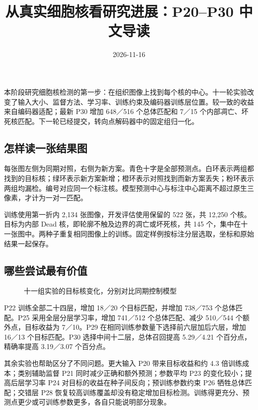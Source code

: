 \documentclass[
  11pt,
  fontset=fandol]{ctexart}
\title{从真实细胞核看研究进展：P20--P30 中文导读}
\author{}
\date{2026-11-16}
\begin{document}
\maketitle

{
\setcounter{tocdepth}{2}
\tableofcontents
}
本阶段研究细胞核检测的第一步：在组织图像上找到每个核的中心。十一轮实验改变了输入大小、监督方法、学习率、训练约束及编码器训练层位置。较一致的收益来自编码器适配；最新
P30 增加 648／516 个总体匹配和 7／15
个内部凋亡、坏死核匹配。下一轮已经提交，转向点解码器中的固定组归一化。

\subsection{怎样读一张结果图}\label{ux600eux6837ux8bfbux4e00ux5f20ux7ed3ux679cux56fe}

每张图左侧为同期对照，右侧为新方案。青色十字是全部预测点。白环表示两组都找到的目标核；绿环表示新方案新增；橙环表示对照找到而新方案丢失；粉环表示两组均漏检。编号对应同一个标注核。模型预测中心与标注中心距离不超过原生三像素，才计为一对一匹配。

训练使用第一折内 2,134 张图像，开发评估使用保留的 522 张，共 12,250
个核。目标为内部 Dead 核，即轮廓不触及边界的凋亡或坏死核，共 145
个，集中在十一张图中。两种子重复相同图像上的训练。固定样例按标注分层选取，坐标和原始结果一起保存。

\subsection{哪些尝试最有价值}\label{ux54eaux4e9bux5c1dux8bd5ux6700ux6709ux4ef7ux503c}

\begin{figure}[H]\centering

\caption{十一组实验的目标核变化，分别对比同期控制模型}
\end{figure}

P22 训练全部二十四层，增加 18／20 个目标匹配，并增加 738／753
个总体匹配。P25 采用全层分层学习率，增加 741／512 个总体匹配、减少
510／544 个额外点，目标收益为 7／10。P29
在相同训练参数量下选择前六层加后六层，增加 16／13 个目标匹配。P30
选择中间十二层，总体召回提高 5.29／4.21 个百分点，精确率提高 3.19／3.07
个百分点。

其余实验也帮助区分了不同问题。更大输入 P20 带来目标收益和约 4.3
倍训练成本；类别辅助监督 P21 同时减少正确和额外预测；参数平均 P23
的变化较小；提高后层学习率 P24 对目标的收益在种子间反向；预训练参数约束
P26 牺牲总体匹配；交错层 P28
恢复较高训练覆盖却没有稳定增加目标检测。训练得更充分、预测点更少或可训练参数更多，各自只能说明部分现象。
\end{document}
